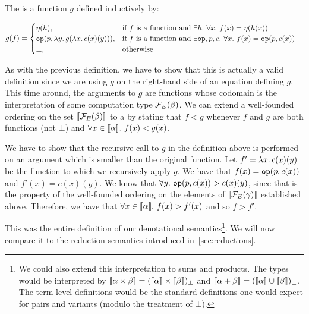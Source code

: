 \begin{definition}
  The  is a function $g$
  defined inductively by:
  
  \begin{align*}
    g(f) &= \begin{cases}
      \eta(h), & \text{if $f$ is a function and $\exists h.\ \forall x.\ f(x) = \eta(h(x))$} \\
      \mathtt{op}(p, \lambda y.\, g(\lambda x.\, c(x)(y))), & \text{if $f$ is a function and $\exists \mathtt{op},p,c.\ \forall x.\ f(x) = \mathtt{op}(p, c(x))$} \\
      \bot, & \text{otherwise} \\
    \end{cases}
  \end{align*}
  
  As with the previous definition, we have to show that this is actually a
  valid definition since we are using $g$ on the right-hand side of an
  equation defining $g$. This time around, the arguments to $g$ are
  functions whose codomain is the interpretation of some computation type
  $\mathcal{F}_E(\beta)$. We can extend a well-founded ordering on the set
  $\llbracket \mathcal{F}_E(\beta) \rrbracket$ to a  by stating that $f < g$ whenever $f$
  and $g$ are both functions (not $\bot$) and
  $\forall x \in \llbracket \alpha \rrbracket.\ f(x) < g(x)$.
  
  We have to show that the recursive call to $g$ in the definition above is
  performed on an argument which is smaller than the original function. Let
  $f' = \lambda x.\, c(x)(y)$ be the function to which we recursively apply
  $g$. We have that $f(x) = \mathtt{op}(p, c(x))$ and $f'(x) = c(x)(y)$. We
  know that $\forall y.\ \mathtt{op}(p, c(x)) > c(x)(y)$, since that is the
  property of the well-founded ordering on the elements of
  $\llbracket \mathcal{F}_E(\gamma) \rrbracket$ established above. Therefore, we have that
  $\forall x \in \llbracket \alpha \rrbracket.\ f(x) > f'(x)$ and so $f > f'$.
\end{definition}

This was the entire definition of our denotational semantics\footnote{We
  could also extend this interpretation to sums and products. The types
  would be interpreted by
  $\llbracket \alpha \times \beta \rrbracket = (\llbracket \alpha \rrbracket \times \llbracket \beta \rrbracket)_\bot$ and
  $\llbracket \alpha + \beta \rrbracket = (\llbracket \alpha \rrbracket \uplus \llbracket \beta \rrbracket)_\bot$. The term
  level definitions would be the standard definitions one would expect for
  pairs and variants (modulo the treatment of $\bot$).}. We will now
compare it to the reduction semantics introduced in~\ref{sec:reductions}.

